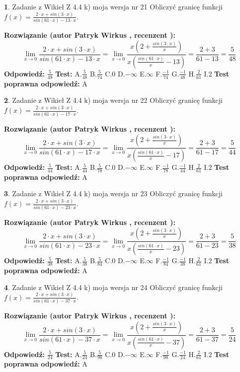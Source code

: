 \documentclass[12pt, a4paper]{article}
\theoremstyle{definition} %
\newtheorem{zad}{}
\newcommand{\zadStart}[1]{\begin{zad}#1\newline}
\newcommand{\zadStop}{\end{zad}}
\newcommand{\rozwStart}[2]{\noindent \textbf{Rozwiązanie (autor #1 , recenzent #2): }\newline}
\newcommand{\rozwStop}{\newline}
\newcommand{\odpStart}{\noindent \textbf{Odpowiedź:}\newline}
\newcommand{\odpStop}{\newline}
\newcommand{\testStart}{\noindent \textbf{Test:}\newline}
\newcommand{\testStop}{\newline}
\newcommand{\kluczStart}{\noindent \textbf{Test poprawna odpowiedź:}\newline}
\newcommand{\kluczStop}{\newline}
\begin{document}
\zadStart{Zadanie z Wikieł Z 4.4 k) moja wersja nr 21}
Obliczyć granicę funkcji $f(x)=\frac{2\cdot x +sin(3\cdot x)}{sin(61\cdot x) -13\cdot x}$.
\zadStop
\rozwStart{Patryk Wirkus}{}
$$\lim\limits_{x\to 0}\frac{2\cdot x +sin(3\cdot x)}{sin(61\cdot x) -13\cdot x}
=\lim\limits_{x\to 0}\frac{x(2+\frac{sin(3\cdot x)}{x})}{x(\frac{sin(61\cdot x)}{x}-13)}
=\frac{2+3}{61-13} = \frac{5}{48}$$
\rozwStop
\odpStart
$\frac{5}{48}$
\odpStop
\testStart
A.$\frac{5}{48}$
B.$\frac{5}{74}$
C.$0$
D.$-\infty$
E.$\infty$
F.$\frac{-1}{74}$
G.$\frac{-1}{48}$
H.$\frac{2}{61}$
I.$2$
\testStop
\kluczStart
A
\kluczStop



\zadStart{Zadanie z Wikieł Z 4.4 k) moja wersja nr 22}
Obliczyć granicę funkcji $f(x)=\frac{2\cdot x +sin(3\cdot x)}{sin(61\cdot x) -17\cdot x}$.
\zadStop
\rozwStart{Patryk Wirkus}{}
$$\lim\limits_{x\to 0}\frac{2\cdot x +sin(3\cdot x)}{sin(61\cdot x) -17\cdot x}
=\lim\limits_{x\to 0}\frac{x(2+\frac{sin(3\cdot x)}{x})}{x(\frac{sin(61\cdot x)}{x}-17)}
=\frac{2+3}{61-17} = \frac{5}{44}$$
\rozwStop
\odpStart
$\frac{5}{44}$
\odpStop
\testStart
A.$\frac{5}{44}$
B.$\frac{5}{78}$
C.$0$
D.$-\infty$
E.$\infty$
F.$\frac{-1}{78}$
G.$\frac{-1}{44}$
H.$\frac{2}{61}$
I.$2$
\testStop
\kluczStart
A
\kluczStop



\zadStart{Zadanie z Wikieł Z 4.4 k) moja wersja nr 23}
Obliczyć granicę funkcji $f(x)=\frac{2\cdot x +sin(3\cdot x)}{sin(61\cdot x) -23\cdot x}$.
\zadStop
\rozwStart{Patryk Wirkus}{}
$$\lim\limits_{x\to 0}\frac{2\cdot x +sin(3\cdot x)}{sin(61\cdot x) -23\cdot x}
=\lim\limits_{x\to 0}\frac{x(2+\frac{sin(3\cdot x)}{x})}{x(\frac{sin(61\cdot x)}{x}-23)}
=\frac{2+3}{61-23} = \frac{5}{38}$$
\rozwStop
\odpStart
$\frac{5}{38}$
\odpStop
\testStart
A.$\frac{5}{38}$
B.$\frac{5}{84}$
C.$0$
D.$-\infty$
E.$\infty$
F.$\frac{-1}{84}$
G.$\frac{-1}{38}$
H.$\frac{2}{61}$
I.$2$
\testStop
\kluczStart
A
\kluczStop



\zadStart{Zadanie z Wikieł Z 4.4 k) moja wersja nr 24}
Obliczyć granicę funkcji $f(x)=\frac{2\cdot x +sin(3\cdot x)}{sin(61\cdot x) -37\cdot x}$.
\zadStop
\rozwStart{Patryk Wirkus}{}
$$\lim\limits_{x\to 0}\frac{2\cdot x +sin(3\cdot x)}{sin(61\cdot x) -37\cdot x}
=\lim\limits_{x\to 0}\frac{x(2+\frac{sin(3\cdot x)}{x})}{x(\frac{sin(61\cdot x)}{x}-37)}
=\frac{2+3}{61-37} = \frac{5}{24}$$
\rozwStop
\odpStart
$\frac{5}{24}$
\odpStop
\testStart
A.$\frac{5}{24}$
B.$\frac{5}{98}$
C.$0$
D.$-\infty$
E.$\infty$
F.$\frac{-1}{98}$
G.$\frac{-1}{24}$
H.$\frac{2}{61}$
I.$2$
\testStop
\kluczStart
A
\kluczStop
\end{document}
